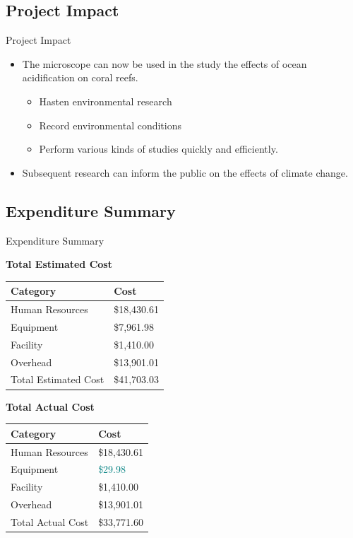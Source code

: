 \documentclass[17pt, aspectratio=169]{beamer}
\begin{document}
\subsection*{Project Impact}
\begin{frame}{Project Impact}
	\begin{itemize}
		\item The microscope can now be used in the study the effects of ocean acidification on coral reefs.
		      \begin{itemize}
			      \item Hasten environmental research
			      \item Record environmental conditions
			      \item Perform various kinds of studies quickly and efficiently.
		      \end{itemize}
		\item Subsequent research can inform the public on the effects of climate change.
	\end{itemize}
\end{frame}
\subsection*{Expenditure Summary}
\begin{frame}{Expenditure Summary}
	\begin{center}
		\textbf{Total Estimated Cost}
		\begin{tabular}{||m{}|m{}||}
			\hline 
			Category & Cost \\
			\hline
			Human Resources & \$18,430.61 \\
			\hline
			Equipment & \$7,961.98 \\
			\hline
			Facility & \$1,410.00 \\
			\hline 
			Overhead & \$13,901.01  \\
			\hline
			Total Estimated Cost & \$41,703.03 \\
			\hline
		\end{tabular}
	\end{center}
\end{frame}
\begin{frame}
	\begin{center}
		\textbf{Total Actual Cost}
		\begin{tabular}{||m{}|m{}||}
			\hline 
			Category & Cost \\
			\hline
			Human Resources & \$18,430.61 \\
			\hline
			Equipment & \textcolor{teal}{\$29.98} \\
			\hline
			Facility & \$1,410.00 \\
			\hline 
			Overhead & \$13,901.01 \\
			\hline
			Total Actual Cost & \$33,771.60 \\
			\hline
		\end{tabular}
	\end{center}
\end{frame}
\end{document}
